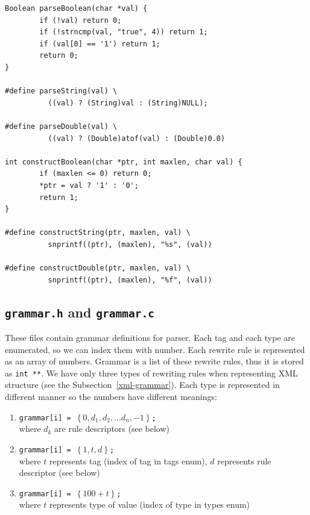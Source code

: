 \documentclass[12pt,notitlepage]{report}
\begin{document}
\begin{small}
\begin{lstlisting}
Boolean parseBoolean(char *val) {
        if (!val) return 0;
        if (!strncmp(val, "true", 4)) return 1;
        if (val[0] == '1') return 1;
        return 0;
}

#define parseString(val) \
          ((val) ? (String)val : (String)NULL);

#define parseDouble(val) \
          ((val) ? (Double)atof(val) : (Double)0.0)

int constructBoolean(char *ptr, int maxlen, char val) {
        if (maxlen <= 0) return 0;
        *ptr = val ? '1' : '0';
        return 1;
}

#define constructString(ptr, maxlen, val) \
          snprintf((ptr), (maxlen), "%s", (val))

#define constructDouble(ptr, maxlen, val) \
          snprintf((ptr), (maxlen), "%f", (val))
\end{lstlisting}
\end{small}

\subsection{\texttt{grammar.h} and \texttt{grammar.c}}
\label{sub-grammar}
These files contain grammar definitions for parser. Each tag and each type are enumerated, so we can index them with number. Each rewrite rule is represented as an array of numbers. Grammar is a list of these rewrite rules, thus it is stored as \texttt{int **}. We have only three types of rewriting rules when representing XML structure (see the Subsection~\ref{xml-grammar}). Each type is represented in different manner so the numbers have different meanings:

\begin{enumerate}
 \item \texttt{grammar[i] = $\left\lbrace 0, d_{1}, d_{2}, ... d_{n}, -1 \right\rbrace$;} \\ where
    $d_{k}$ are rule descriptors (see below)
 \item \texttt{grammar[i] =  $\left\lbrace 1, t, d \right\rbrace$;} \\ where
    $t$ represents tag (index of tag in tags enum), $d$ represents rule descriptor (see below)
 \item \texttt{grammar[i] =  $\left\lbrace 100 + t \right\rbrace$;} \\ where
    $t$ represents type of value (index of type in types enum)
\end{enumerate}
\end{document}
